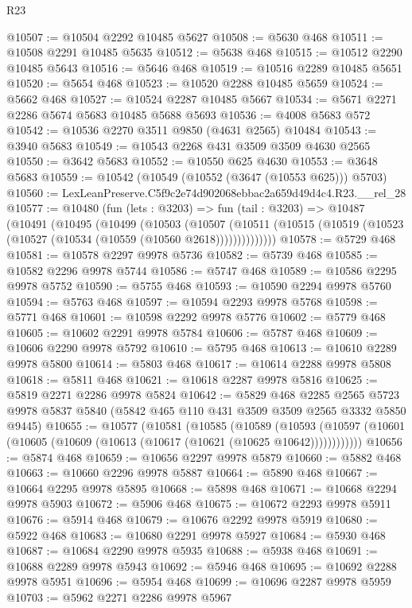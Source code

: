 \begin{lexlean}{R23}
\begin{coremodule}
@10507 := @10504 @2292 @10485 @5627
@10508 := @5630 @468
@10511 := @10508 @2291 @10485 @5635
@10512 := @5638 @468
@10515 := @10512 @2290 @10485 @5643
@10516 := @5646 @468
@10519 := @10516 @2289 @10485 @5651
@10520 := @5654 @468
@10523 := @10520 @2288 @10485 @5659
@10524 := @5662 @468
@10527 := @10524 @2287 @10485 @5667
@10534 := @5671 @2271 @2286 @5674 @5683 @10485 @5688 @5693
@10536 := @4008 @5683 @572
@10542 := @10536 @2270 @3511 @9850 (@4631 @2565) @10484
@10543 := @3940 @5683
@10549 := @10543 @2268 @431 @3509 @3509 @4630 @2565
@10550 := @3642 @5683
@10552 := @10550 @625 @4630
@10553 := @3648 @5683
@10559 := @10542 (@10549 (@10552 (@3647 (@10553 @625))) @5703)
@10560 := LexLeanPreserve.C5f9c2e74d902068ebbac2a659d49d4c4.R23.__rel_28
@10577 := @10480
    (fun (lets : @3203) =>
    fun (tail : @3203) =>
    @10487
      (@10491
        (@10495
          (@10499
            (@10503
              (@10507
                (@10511 (@10515 (@10519 (@10523 (@10527 (@10534 (@10559 (@10560 @2618))))))))))))))
@10578 := @5729 @468
@10581 := @10578 @2297 @9978 @5736
@10582 := @5739 @468
@10585 := @10582 @2296 @9978 @5744
@10586 := @5747 @468
@10589 := @10586 @2295 @9978 @5752
@10590 := @5755 @468
@10593 := @10590 @2294 @9978 @5760
@10594 := @5763 @468
@10597 := @10594 @2293 @9978 @5768
@10598 := @5771 @468
@10601 := @10598 @2292 @9978 @5776
@10602 := @5779 @468
@10605 := @10602 @2291 @9978 @5784
@10606 := @5787 @468
@10609 := @10606 @2290 @9978 @5792
@10610 := @5795 @468
@10613 := @10610 @2289 @9978 @5800
@10614 := @5803 @468
@10617 := @10614 @2288 @9978 @5808
@10618 := @5811 @468
@10621 := @10618 @2287 @9978 @5816
@10625 := @5819 @2271 @2286 @9978 @5824
@10642 := @5829
    @468
    @2285
    @2565
    @5723
    @9978
    @5837
    @5840
    (@5842 @465 @110 @431 @3509 @3509 @2565 @3332 @5850 @9445)
@10655 := @10577
    (@10581
      (@10585
        (@10589
          (@10593 (@10597 (@10601 (@10605 (@10609 (@10613 (@10617 (@10621 (@10625 @10642))))))))))))
@10656 := @5874 @468
@10659 := @10656 @2297 @9978 @5879
@10660 := @5882 @468
@10663 := @10660 @2296 @9978 @5887
@10664 := @5890 @468
@10667 := @10664 @2295 @9978 @5895
@10668 := @5898 @468
@10671 := @10668 @2294 @9978 @5903
@10672 := @5906 @468
@10675 := @10672 @2293 @9978 @5911
@10676 := @5914 @468
@10679 := @10676 @2292 @9978 @5919
@10680 := @5922 @468
@10683 := @10680 @2291 @9978 @5927
@10684 := @5930 @468
@10687 := @10684 @2290 @9978 @5935
@10688 := @5938 @468
@10691 := @10688 @2289 @9978 @5943
@10692 := @5946 @468
@10695 := @10692 @2288 @9978 @5951
@10696 := @5954 @468
@10699 := @10696 @2287 @9978 @5959
@10703 := @5962 @2271 @2286 @9978 @5967

\end{coremodule}
\end{lexlean}
